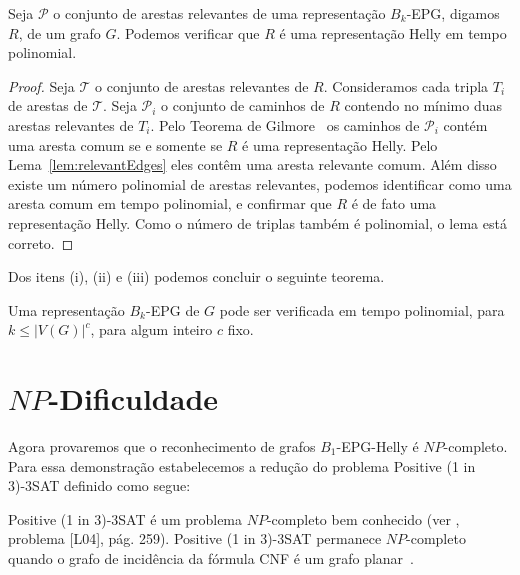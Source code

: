 
\begin{lema}
Seja $\mathcal{P}$ o conjunto de arestas relevantes de uma representação $B_k$-EPG, digamos  $R$, de um grafo  $G$. Podemos verificar que   $R$ é uma representação Helly em tempo polinomial.
\end{lema}

\begin{proof}
Seja $\mathcal{T}$ o conjunto de arestas relevantes de $R$. Consideramos cada tripla $T_i$ de arestas de  $\mathcal{T}$. Seja $\mathcal{P}_i$ o conjunto de caminhos de  $R$ contendo no mínimo duas arestas relevantes de $T_i$. Pelo Teorema de Gilmore~\cite{bergeDuchet1975} os caminhos de $\mathcal{P}_i$ contém uma aresta comum se e somente se  $R$  é uma representação Helly.  Pelo Lema~\ref{lem:relevantEdges} eles contêm uma aresta relevante comum. Além disso existe um número polinomial de arestas relevantes, podemos identificar como uma aresta comum em tempo polinomial, e confirmar que $R$ é de fato uma representação Helly. Como o número de triplas também é polinomial, o lema está correto.
 \end{proof} %

Dos itens (i), (ii) e (iii) podemos concluir o seguinte teorema.

\begin{theorem} \label{teo:npdificuldade}
Uma representação $B_k$-EPG de $G$ pode ser verificada em tempo polinomial, para  $k\leq |V(G)|^c$, para algum inteiro $c$ fixo.
\end{theorem}


\section{$NP$-Dificuldade}\label{sec:sectionDispositivoClausula}

Agora provaremos que o reconhecimento de grafos   $B_1$-EPG-Helly é $NP$-completo. Para essa demonstração estabelecemos a redução do problema {\sc Positive (1 in 3)-3SAT} definido como segue:



{\sc Positive (1 in 3)-3SAT } é um problema $NP$-completo bem conhecido (ver \cite{johnson1979}, problema [L04], pág. 259). {\sc Positive (1 in 3)-3SAT} permanece $NP$-completo quando o grafo de incidência da fórmula CNF é um grafo planar~\cite{mulzer2008minimum}.


